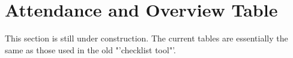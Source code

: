 \section{Attendance and Overview Table}

This section is still under construction. The current tables are essentially the same as those used in the old "'checklist tool"'.